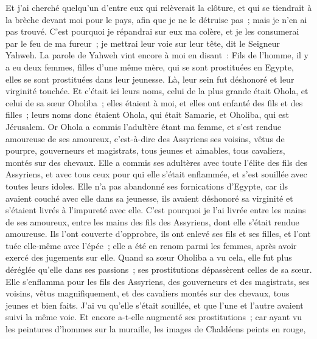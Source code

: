 \begin{multicols}{2}
Et j'ai cherché quelqu'un d'entre eux qui relèverait la clôture, et qui se tiendrait à la brèche devant moi pour le pays, afin que je ne le détruise pas~; mais je n'en ai pas trouvé.
C'est pourquoi je répandrai sur eux ma colère, et je les consumerai par le feu de ma fureur~; je mettrai leur voie sur leur tête, dit le Seigneur Yahweh.
\VerseOne{}La parole de Yahweh vint encore à moi en disant~:
Fils de l'homme, il y a eu deux femmes, filles d'une même mère,
qui se sont prostituées en Egypte, elles se sont prostituées dans leur jeunesse. Là, leur sein fut déshonoré et leur virginité touchée.
Et c'était ici leurs noms, celui de la plus grande était Ohola, et celui de sa sœur Oholiba~; elles étaient à moi, et elles ont enfanté des fils et des filles~; leurs noms donc étaient Ohola, qui était Samarie, et Oholiba, qui est Jérusalem.
Or Ohola a commis l'adultère étant ma femme, et s'est rendue amoureuse de ses amoureux, c'est-à-dire des Assyriens ses voisins,
vêtus de pourpre, gouverneurs et magistrats, tous jeunes et aimables, tous cavaliers, montés sur des chevaux.
Elle a commis ses adultères avec toute l'élite des fils des Assyriens, et avec tous ceux pour qui elle s'était enflammée, et s'est souillée avec toutes leurs idoles.
Elle n'a pas abandonné ses fornications d'Egypte, car ils avaient couché avec elle dans sa jeunesse, ils avaient déshonoré sa virginité et s'étaient livrés à l'impureté avec elle.
C'est pourquoi je l'ai livrée entre les mains de ses amoureux, entre les mains des fils des Assyriens, dont elle s'était rendue amoureuse.
Ils l'ont couverte d'opprobre, ils ont enlevé ses fils et ses filles, et l'ont tuée elle-même avec l'épée~; elle a été en renom parmi les femmes, après avoir exercé des jugements sur elle.
Quand sa sœur Oholiba a vu cela, elle fut plus déréglée qu'elle dans ses passions~; ses prostitutions dépassèrent celles de sa sœur.
Elle s'enflamma pour les fils des Assyriens, des gouverneurs et des magistrats, ses voisins, vêtus magnifiquement, et des cavaliers montés sur des chevaux, tous jeunes et bien faits.
J'ai vu qu'elle s'était souillée, et que l'une et l'autre avaient suivi la même voie.
Et encore a-t-elle augmenté ses prostitutions~; car ayant vu les peintures d'hommes sur la muraille, les images de Chaldéens peints en rouge,

\end{multicols}
